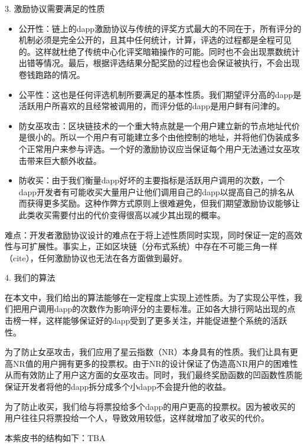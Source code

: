3. 激励协议需要满足的性质
\begin{itemize}
	\item 公开性：链上的dapp激励协议与传统的评奖方式最大的不同在于，所有评分的机制必须是完全公开的，且其中任何统计，计算，评选的过程都是全程可见的。这样就杜绝了传统中心化评奖暗箱操作的可能。同时也不会出现票数统计出错等情况。最后，根据评选结果分配奖励的过程也会保证被执行，不会出现卷钱跑路的情况。
	\item 公平性：这也是任何评选机制所要满足的基本性质。我们期望评分高的dapp是活跃用户所喜欢的且经常被调用的，而评分低的dapp是用户鲜有问津的。
	\item 防女巫攻击：区块链技术的一个重大特点就是一个用户建立新的节点地址代价是很小的。所以一个用户有可能建立多个由他控制的地址，并将他们伪装成多个正常用户来参与评选。一个好的激励协议应当保证每个用户无法通过女巫攻击带来巨大额外收益。
	\item 防收买：由于我们衡量dapp好坏的主要指标是活跃用户调用的次数，一个dapp开发者有可能收买大量用户让他们调用自己的dapp以提高自己的排名从而获得更多奖励。这种作弊方式原则上很难避免，但我们期望激励协议能够让此类收买需要付出的代价变得很高以减少其出现的概率。
\end{itemize}

难点：开发者激励协议设计的难点在于将上述性质同时实现，同时保证一定的高效性与可扩展性。事实上，正如区块链（分布式系统）中存在不可能三角一样（cite），任何激励协议也无法在各方面做到最好。

4. 我们的算法

在本文中，我们给出的算法能够在一定程度上实现上述性质。为了实现公平性，我们把用户调用dapp的次数作为影响评分的主要标准。正如各大排行网站出现的点击榜一样，这样能够保证好的dapp受到了更多关注，并能促进整个系统的活跃性。

为了防止女巫攻击，我们应用了星云指数（NR）本身具有的性质。我们让具有更高NR值的用户拥有更多的投票权。由于NR的设计保证了伪造高NR用户的困难性从而有效防止了用户这方面的女巫攻击。同时，我们最终奖励函数的凹函数性质能保证开发者将他的dapp拆分成多个小dapp不会提升他的收益。

为了防止收买，我们给与将票投给多个dapp的用户更高的投票权。因为被收买的用户往往只将票投给一个人，导致效用较低，这样就增加了收买的代价。

本紫皮书的结构如下：TBA
